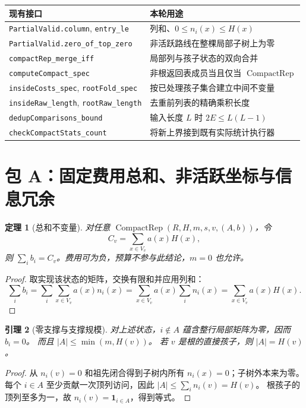 \documentclass[UTF8,a4paper,11pt]{ctexart}
\newtheorem{theorem}{定理}[section]
\newtheorem{lemma}[theorem]{引理}
\theoremstyle{definition}
\newcommand{\Rep}{\operatorname{CompactRep}}
\begin{document}
\begin{longtable}{p{}p{}}
\toprule 现有接口 & 本轮用途 \\ \midrule
\texttt{PartialValid.column}, \texttt{entry\_le} & 列和、$0\le n_i(x)\le H(x)$ \\
\texttt{PartialValid.zero\_of\_top\_zero} & 非活跃路线在整棵局部子树上为零 \\
\texttt{compactRep\_merge\_iff} & 局部列与孩子状态的双向合并 \\
\texttt{computeCompact\_spec} & 非根返回表成员当且仅当 $\Rep$ \\
\texttt{insideCosts\_spec}, \texttt{rootFold\_spec} & 按已处理孩子集合建立中间不变量 \\
\texttt{insideRaw\_length}, \texttt{rootRaw\_length} & 去重前列表的精确乘积长度 \\
\texttt{dedupComparisons\_bound} & 输入长度 $L$ 时 $2E\le L(L-1)$ \\
\texttt{checkCompactStats\_count} & 将新上界接到既有实际统计执行器 \\
\bottomrule
\end{longtable}

\section{包 A：固定费用总和、非活跃坐标与信息冗余}

\begin{theorem}[总和不变量]
对任意 $\Rep(R,H,m,s,v,(A,b))$，令
\[
 C_v=\sum_{x\in V_v}a(x)H(x),
\]
则 $\sum_i b_i=C_v$。费用可为负，预算不参与此结论，$m=0$ 也允许。
\end{theorem}
\begin{proof}
取实现该状态的矩阵，交换有限和并应用列和：
\[
 \sum_i b_i=\sum_i\sum_{x\in V_v}a(x)n_i(x)
 =\sum_{x\in V_v}a(x)\sum_i n_i(x)
 =\sum_{x\in V_v}a(x)H(x).
\]
\end{proof}

\begin{lemma}[零支撑与支撑规模]
对上述状态，$i\notin A$ 蕴含整行局部矩阵为零，因而 $b_i=0$。
而且 $|A|\le\min(m,H(v))$。
若 $v$ 是根的直接孩子，则 $|A|=H(v)$。
\end{lemma}
\begin{proof}
从 $n_i(v)=0$ 和祖先闭合得到子树内所有 $n_i(x)=0$；子树外本来为零。
每个 $i\in A$ 至少贡献一次顶列访问，因此
$|A|\le\sum_i n_i(v)=H(v)$。
根孩子的顶列至多为一，故 $n_i(v)=\mathbf1_{i\in A}$，得到等式。
\end{proof}
\end{document}
